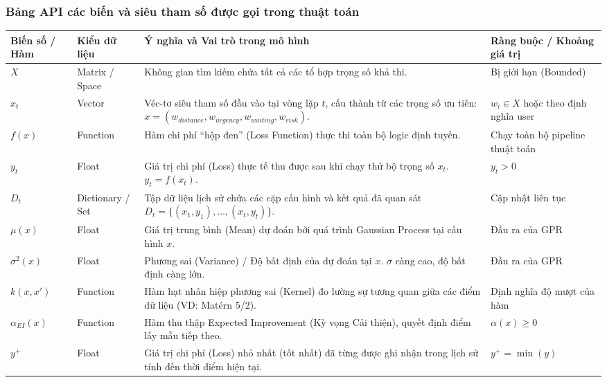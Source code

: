 \documentclass[twoside,12pt]{article}
\begin{document}
\subsubsection{Bảng API các biến và siêu tham số được gọi trong thuật toán}
\begingroup
\footnotesize
\setlength{\tabcolsep}{2pt}
\begin{longtable}{@{}>{\raggedright\arraybackslash}p{}>{\raggedright\arraybackslash}p{}>{\raggedright\arraybackslash}p{}>{\raggedright\arraybackslash}p{}@{}}
\toprule
\textbf{Biến số / Hàm} & \textbf{Kiểu dữ liệu} & \textbf{Ý nghĩa và Vai trò trong mô hình} & \textbf{Ràng buộc / Khoảng giá trị} \\
\midrule
\endhead
$X$ & Matrix / Space & Không gian tìm kiếm chứa tất cả các tổ hợp trọng số khả thi. & Bị giới hạn (Bounded) \\
$x_t$ & Vector & Véc-tơ siêu tham số đầu vào tại vòng lặp $t$, cấu thành từ các trọng số ưu tiên: $x=(w_{distance},w_{urgency},w_{waiting},w_{risk})$. & $w_i \in X$ hoặc theo định nghĩa user \\
$f(x)$ & Function & Hàm chi phí ``hộp đen'' (Loss Function) thực thi toàn bộ logic định tuyến. & Chạy toàn bộ pipeline thuật toán \\
$y_t$ & Float & Giá trị chi phí (Loss) thực tế thu được sau khi chạy thử bộ trọng số $x_t$. $y_t=f(x_t)$. & $y_t>0$ \\
$D_t$ & Dictionary / Set & Tập dữ liệu lịch sử chứa các cặp cấu hình và kết quả đã quan sát $D_t=\{(x_1,y_1),\dots,(x_t,y_t)\}$. & Cập nhật liên tục \\
$\mu(x)$ & Float & Giá trị trung bình (Mean) dự đoán bởi quá trình Gaussian Process tại cấu hình $x$. & Đầu ra của GPR \\
$\sigma^2(x)$ & Float & Phương sai (Variance) / Độ bất định của dự đoán tại $x$. $\sigma$ càng cao, độ bất định càng lớn. & Đầu ra của GPR \\
$k(x,x')$ & Function & Hàm hạt nhân hiệp phương sai (Kernel) đo lường sự tương quan giữa các điểm dữ liệu (VD: Matérn 5/2). & Định nghĩa độ mượt của hàm \\
$\alpha_{EI}(x)$ & Function & Hàm thu thập Expected Improvement (Kỳ vọng Cải thiện), quyết định điểm lấy mẫu tiếp theo. & $\alpha(x)\ge 0$ \\
$y^+$ & Float & Giá trị chi phí (Loss) nhỏ nhất (tốt nhất) đã từng được ghi nhận trong lịch sử tính đến thời điểm hiện tại. & $y^+=\min(y)$ \\
\bottomrule
\end{longtable}
\endgroup
\end{document}
